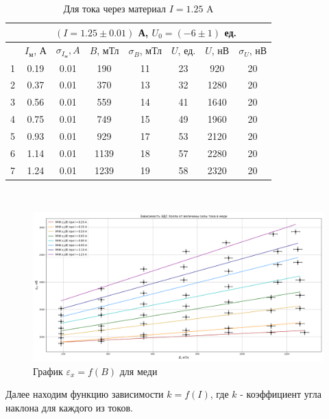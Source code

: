 \documentclass[a4paper,12pt]{article}
\theoremstyle{definition}
\begin{document}
    \begin{table}[H]
      \centering
      \caption{Для тока через материал $I = 1.25$ A}
      \label{tabular:med8}
        \begin{tabular}{|c|c|c|c|c|c|c|c|} \hline
            & \multicolumn{7}{c|}{$(I = 1.25 \pm 0.01)$ А, \qquad $U_0 = (-6 \pm 1)$ ед.} \\ \hline
            & $I_{\text{м}}$, А & $\sigma_{I_{\text{м}}}, A$ & $B$, мТл & $\sigma_B$, мТл & $U$, ед. & $U$, нВ & $\sigma_{U}$, нВ \\ \hline
          1 & 0.19 & 0.01 &  190 & 11 & 23 & 920 & 20 \\ \hline
          2 & 0.37 & 0.01 &  370 & 13 & 32 & 1280 & 20 \\ \hline
          3 & 0.56 & 0.01 &  559 & 14 & 41 & 1640 & 20 \\ \hline
          4 & 0.75 & 0.01 &  749 & 15 & 49 & 1960 & 20 \\ \hline
          5 & 0.93 & 0.01 &  929 & 17 & 53 & 2120 & 20 \\ \hline
          6 & 1.14 & 0.01 & 1139 & 18 & 57 & 2280 & 20 \\ \hline
          7 & 1.24 & 0.01 & 1239 & 19 & 58 & 2320 & 20 \\ \hline
        \end{tabular}\\
    \end{table}

    \begin{figure}[h]
      \centering
        \includegraphics[scale=0.38]{graph-hall-med.png}
      \caption{График $\varepsilon_x = f(B)$ для меди}
    \end{figure}

    Далее находим функцию зависимости $k = f(I)$, где $k$ - коэффициент угла наклона для каждого из токов.\\
\end{document}
